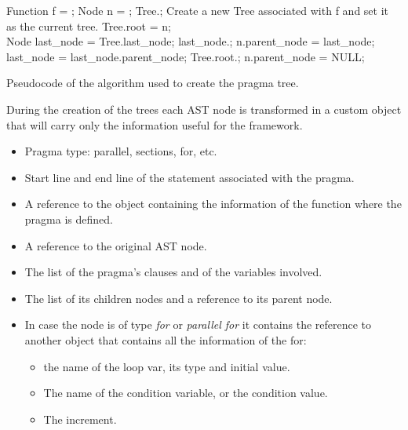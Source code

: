 \documentclass[a4paper,11pt,oneside]{book}
\begin{document}
\begin{algorithm}[H]
\begin{algorithmic}
\State Function f = ; 
\State Node n = ; 
\State Tree.;
\Else
\State Create a new Tree associated with f and set it as the current tree.
\State Tree.root = n;
\EndIf
\EndFor
\EndFunction
\\
\State Node last\_node = Tree.last\_node;
\State last\_node.;
\State n.parent\_node = last\_node;
\State \Return
\Else
\State last\_node = last\_node.parent\_node;
\EndIf
\EndWhile
\State Tree.root.;
\State n.parent\_node = NULL;
\EndFunction

\end{algorithmic}
\caption{Pseudocode of the algorithm used to create the pragma tree.}
\label{tree}
\end{algorithm}





During the creation of the trees each AST node is transformed in a custom object that will carry only the information useful for the framework. 

\begin{itemize}
\item Pragma type: parallel, sections, for, etc.
\item Start line and end line of the statement associated with the pragma.
\item A reference to the object containing the information of the function where the pragma is defined.
\item A reference to the original AST node.
\item The list of the pragma’s clauses and of the variables involved. 
\item The list of its children nodes and a reference to its parent node.
\item In case the node is of type \emph{for} or \emph{parallel for} it contains the reference to another object that contains all the information of the for:
\begin{itemize}
\item the name of the loop var, its type and initial value.
\item The name of the condition variable, or the condition value.
\item The increment.
\end{itemize}
\end{itemize}
\end{document}
